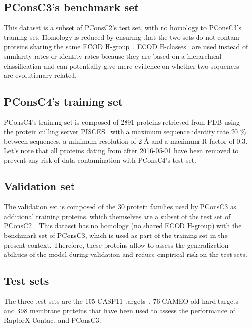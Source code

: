   \subsection{PConsC3's benchmark set}

    This dataset is a subset of PConsC2's test set, with no homology to PConsC3's training set.
    Homology is reduced by ensuring that the two sets do not contain proteins sharing the same
    ECOD H-group~\cite{10.1371/journal.pcbi.1003926}.
    ECOD H-classes~\cite{10.1371/journal.pcbi.1003926} are used instead of similarity rates
    or identity rates because they are based on a hierarchical classification and can
    potentially give more evidence on whether two sequences are evolutionary related.

  \subsection{PConsC4's training set}

    PConsC4's training set is composed of 2891 proteins retrieved from PDB using
    the protein culling server PISCES~\cite{wang2003pisces} with a maximum
    sequence identity rate 20 \% between sequences, a minimum resolution of 2 \AA{}
    and a maximum R-factor of 0.3.
    Let's note that all proteins dating from after 2016-05-01 have been removed to prevent
    any risk of data contamination with PConsC4's test set.

  \subsection{Validation set}

    The validation set is composed of the 30 protein families used by PConsC3 as additional
    training proteins, which themselves are a subset of the test set of
    PConsC2~\cite{10.1371/journal.pcbi.1003889}. This dataset has no homology 
    (no shared ECOD H-group) with 
    the benchmark set of PConsC3, which is used as part of the training set in the present context.
    Therefore, these proteins allow to assess the generalization abilities of the model
    during validation and reduce empirical risk on the test sets.

  \subsection{Test sets}

    The three test sets are the 105 CASP11 targets~\cite{doi:10.1002/prot.24452, doi:10.1002/prot.25064},
    76 CAMEO old hard targets~\cite{haas2013protein} and 398 membrane proteins that
    have been used to assess the performance of RaptorX-Contact and PConsC3.


